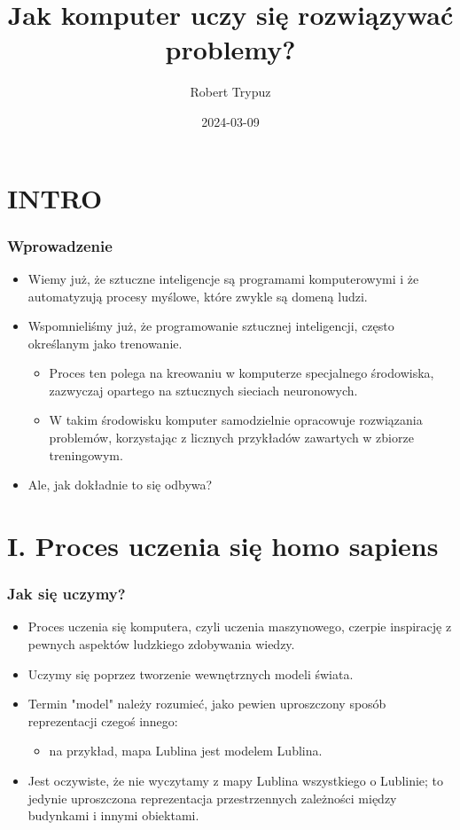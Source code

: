 \documentclass{beamer}
\title{Jak komputer uczy się rozwiązywać problemy?}
\author{Robert Trypuz}
\institute{AI po lekcjach}
\date{2024-03-09}
\begin{document}
\frame{\titlepage}
  

\section{INTRO}

\begin{frame}[fragile]
\frametitle{Wprowadzenie}
 \begin{itemize}
\item Wiemy już, że sztuczne inteligencje są programami komputerowymi i że automatyzują procesy myślowe, które zwykle są domeną ludzi.
\item Wspomnieliśmy już, że programowanie sztucznej inteligencji, często określanym jako trenowanie. 
	\begin{itemize}
	\item Proces ten polega na kreowaniu w komputerze specjalnego środowiska, zazwyczaj opartego na sztucznych sieciach neuronowych.
	\item W takim środowisku komputer samodzielnie opracowuje rozwiązania problemów, korzystając z licznych przykładów zawartych w zbiorze treningowym.
	\end{itemize}
\item Ale, jak dokładnie to się odbywa? 
\end{itemize}

\end{frame}

\section{I. Proces uczenia się homo sapiens}

\begin{frame}[fragile]
\frametitle{Jak się uczymy?}
 \begin{itemize}
\item Proces uczenia się komputera, czyli uczenia maszynowego, czerpie inspirację z pewnych aspektów ludzkiego zdobywania wiedzy.
\item Uczymy się poprzez tworzenie wewnętrznych modeli świata. 
\item Termin "model" należy rozumieć, jako pewien uproszczony sposób reprezentacji czegoś innego: 
	\begin{itemize}
	\item na przykład, mapa Lublina jest modelem Lublina.
	\end{itemize}
\item Jest oczywiste, że nie wyczytamy z mapy Lublina wszystkiego o Lublinie; to jedynie uproszczona reprezentacja przestrzennych zależności między budynkami i innymi obiektami. 
\end{itemize}
\end{frame}
\end{document}
